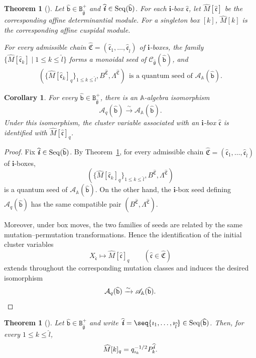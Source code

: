 \documentclass[12pt, leqno]{amsart}
\numberwithin{equation}{section}
\theoremstyle{plain}
\newtheorem{theorem}[lemma]{Theorem}
\newtheorem{corollary}[lemma]{Corollary}
\theoremstyle{definition}
\renewcommand{\le}{\leqslant}
\newcommand{\g}{\mathfrak{g}}
\newcommand{\im}{\imath}
\newcommand{\ii}{ \textbf{\textit{i}}}
\newcommand{\hM}{\widehat{M}}
\newcommand{\hg}{{\widehat{\g}}}
\newcommand{\hl}{\widehat{l}}
\newcommand{\hii}{{\widehat{\ii}}}
\newcommand{\frakC}{\mathfrak{C}}
\newcommand{\frakc}{\mathfrak{c}}
\newcommand{\hfrakC}{\widehat{\frakC}}
\newcommand{\hfrakc}{\widehat{\frakc}}
\newcommand{\bbA}{\mathbb{A}}
\newcommand{\bfi}{\mathbf{i}}
\newcommand{\calA}{\mathcal{A}}
\newcommand{\scrA}{\mathscr{A}}
\newcommand{\scrC}{\mathscr{C}}
\newcommand{\ttB}{\mathtt{B}}
\newcommand{\ttb}{\mathtt{b}}
\newcommand{\httb}{\widehat{\ttb}}
\newcommand{\Seq}{\mathrm{Seq}}
\begin{document}
\begin{theorem}[{\cite[Theorems~9.6 and~9.12]{KKOP25M}}]
\label{thm: monoidal seed for positive braid}
Let $\httb\in\ttB_\hg^+$ and
$\hii\in\Seq(\httb)$.  For each $\bfi$-box $\hfrakc$, let
$\hM[\hfrakc]$ be the corresponding affine determinantial module.
For a singleton box $[k]$, $\hM[k]$ is the corresponding
affine cuspidal module.

For every admissible chain
$\hfrakC=(\hfrakc_1,\ldots,\hfrakc_{\hl})$
of $\bfi$-boxes, the family
$\{\hM[\hfrakc_k]\mid 1\le k\le\hl\}$
forms a monoidal seed of $\scrC_\hg(\httb)$, and
\begin{align} \label{eq: quantum seed}
\left( \{\hM[\hfrakc_k]_q\}_{1\le k\le\hl}, B^{\hfrakC}, \Lambda^{\hfrakC} \right) \ \
\text{is a quantum seed of $\scrA_{\bbA}(\httb)$.}
\end{align}
\end{theorem}

\begin{corollary}
\label{cor: upstairs cluster algebra bosonic}
For every $\httb\in\ttB_\hg^+$, there is an
$\bbA$-algebra isomorphism
\[
\calA_q(\httb) \xrightarrow{\sim} \scrA_{\bbA}(\httb).
\]
Under this isomorphism, the cluster variable associated with an
$\bfi$-box $\hfrakc$ is identified with
$\hM[\hfrakc]_q$.
\end{corollary}

\begin{proof}
Fix $\hii\in\Seq(\httb)$.  By
Theorem~\ref{thm: monoidal seed for positive braid}, for every
admissible chain
$\hfrakC=(\hfrakc_1,\ldots,\hfrakc_{\hl})$
of $\bfi$-boxes,
\[
\left( \{\hM[\hfrakc_k]_q\}_{1\le k\le\hl}, B^{\hfrakC}, \Lambda^{\hfrakC} \right)
\]
is a quantum seed of $\scrA_{\bbA}(\httb)$.
On the other hand, the $\bfi$-box seed defining
$\calA_q(\httb)$ has the same compatible pair
$(B^{\hfrakC},\Lambda^{\hfrakC})$.

Moreover, under box moves, the two families of seeds are related by
the same mutation--permutation transformations.  Hence the
identification of the initial cluster variables
\[
X_{\hfrakc}\longmapsto \hM[\hfrakc]_q \qquad (\hfrakc\in\hfrakC)
\]
extends throughout the corresponding mutation classes and induces
the desired isomorphism
\[
\calA_q(\httb)
\xrightarrow{\sim}
\scrA_{\bbA}(\httb). \qedhere
\]
\end{proof}


\begin{theorem}[{\cite[Theorem~9.12 and its proof]{KKOP25M}}]
\label{thm: affine cuspidal and bosonic PBW}
Let $\httb\in\ttB_\hg^+$ and write
$\hii=\seq{\im_1,\ldots,\im_{\hl}}\in\Seq(\httb)$.
Then, for every $1\le k\le\hl$,
\[
\hM[k]_q=q_{\im_k}^{-1/2}P_k^\hii.
\]
\end{theorem}
\end{document}
